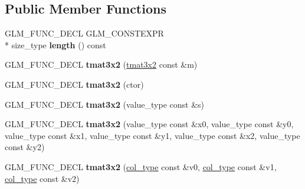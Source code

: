 \subsection*{Public Member Functions}
\begin{DoxyCompactItemize}
\item 
\hypertarget{structglm_1_1detail_1_1tmat3x2_a05bdf3c70f4246d2dad53a1fd3c09125}{G\-L\-M\-\_\-\-F\-U\-N\-C\-\_\-\-D\-E\-C\-L G\-L\-M\-\_\-\-C\-O\-N\-S\-T\-E\-X\-P\-R \\*
size\-\_\-type {\bfseries length} () const }\label{structglm_1_1detail_1_1tmat3x2_a05bdf3c70f4246d2dad53a1fd3c09125}

\item 
\hypertarget{structglm_1_1detail_1_1tmat3x2_aa5dbea756ecc0eeec0f8216ca548ad7f}{G\-L\-M\-\_\-\-F\-U\-N\-C\-\_\-\-D\-E\-C\-L {\bfseries tmat3x2} (\hyperlink{structglm_1_1detail_1_1tmat3x2}{tmat3x2} const \&m)}\label{structglm_1_1detail_1_1tmat3x2_aa5dbea756ecc0eeec0f8216ca548ad7f}

\item 
\hypertarget{structglm_1_1detail_1_1tmat3x2_a3d8f3014b4018f5f37c971851c5e7b16}{G\-L\-M\-\_\-\-F\-U\-N\-C\-\_\-\-D\-E\-C\-L {\bfseries tmat3x2} (ctor)}\label{structglm_1_1detail_1_1tmat3x2_a3d8f3014b4018f5f37c971851c5e7b16}

\item 
\hypertarget{structglm_1_1detail_1_1tmat3x2_ab49e902c0a394041a6d4c8f6b7b0a2c3}{G\-L\-M\-\_\-\-F\-U\-N\-C\-\_\-\-D\-E\-C\-L {\bfseries tmat3x2} (value\-\_\-type const \&s)}\label{structglm_1_1detail_1_1tmat3x2_ab49e902c0a394041a6d4c8f6b7b0a2c3}

\item 
\hypertarget{structglm_1_1detail_1_1tmat3x2_a28f71340efef5de0d7aac9da94ca4d40}{G\-L\-M\-\_\-\-F\-U\-N\-C\-\_\-\-D\-E\-C\-L {\bfseries tmat3x2} (value\-\_\-type const \&x0, value\-\_\-type const \&y0, value\-\_\-type const \&x1, value\-\_\-type const \&y1, value\-\_\-type const \&x2, value\-\_\-type const \&y2)}\label{structglm_1_1detail_1_1tmat3x2_a28f71340efef5de0d7aac9da94ca4d40}

\item 
\hypertarget{structglm_1_1detail_1_1tmat3x2_ab360bb1d2217122998f0c3bfc936c538}{G\-L\-M\-\_\-\-F\-U\-N\-C\-\_\-\-D\-E\-C\-L {\bfseries tmat3x2} (\hyperlink{structglm_1_1detail_1_1tvec2}{col\-\_\-type} const \&v0, \hyperlink{structglm_1_1detail_1_1tvec2}{col\-\_\-type} const \&v1, \hyperlink{structglm_1_1detail_1_1tvec2}{col\-\_\-type} const \&v2)}\label{structglm_1_1detail_1_1tmat3x2_ab360bb1d2217122998f0c3bfc936c538}


\end{DoxyCompactItemize}
